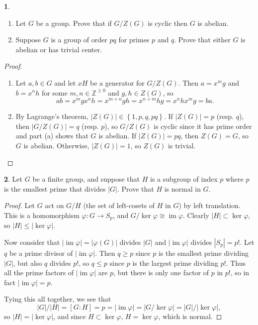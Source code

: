 \documentclass[12pt]{article}
\DeclareMathOperator{\im}{im}
\theoremstyle{definition}
\newtheorem{ex}{}
\begin{document}
\begin{ex}\
	\begin{enumerate}[label=(\alph*)]
		\item Let $G$ be a group.
		      Prove that if $G/Z(G)$ is cyclic then $G$ is abelian.
		\item Suppose $G$ is a group of order $pq$ for primes $p$ and $q$.
		      Prove that either $G$ is abelian or has trivial center.
	\end{enumerate}
\end{ex}
\begin{proof}\
	\begin{enumerate}[label=(\alph*)]
		\item Let $a, b \in G$ and let $xH$ be a generator for $G/Z(G)$.
		      Then $a = x^mg$ and $b = x^nh$ for some $m, n \in \mathbb{Z}^{\geq 0}$ and $g, h \in Z(G)$, so \begin{equation*}
			      ab = x^mgx^nh = x^{m+n}gh = x^{n+m}hg = x^nhx^mg = ba.
		      \end{equation*}
		\item By Lagrange's theorem, $|Z(G)| \in \left\lbrace 1, p, q, pq \right\rbrace$.
		      If $|Z(G)| = p$ (resp. $q$), then $|G/Z(G)| = q$ (resp. $p$), so $G/Z(G)$ is cyclic since it has prime order and part (a) shows that $G$ is abelian.
		      If $|Z(G)| = pq$, then $Z(G) = G$, so $G$ is abelian.
		      Otherwise, $|Z(G)| = 1$, so $Z(G)$ is trivial.
	\end{enumerate}
\end{proof}

\begin{ex}
	Let $G$ be a finite group, and suppose that $H$ is a subgroup of index $p$ where $p$ is the smallest prime that divides $|G|$.
	Prove that $H$ is normal in $G$.
\end{ex}
\begin{proof}
	Let $G$ act on $G/H$ (the set of left-cosets of $H$ in $G$) by left translation.
	This is a homomorphism $\varphi : G \to S_p$, and $G/\ker \varphi \cong \im \varphi$.
	Clearly $|H| \subset \ker \varphi$, so $|H| \leq |\ker \varphi|$.

	Now consider that $|\im \varphi| = |\varphi(G)|$ divides $|G|$ and $|\im\varphi|$ divides $|S_p|=p!$.
	Let $q$ be a prime divisor of $|\im\varphi|$.
	Then $q \geq p$ since $p$ is the smallest prime dividing $|G|$, but also $q$ divides $p!$, so $q \leq p$ since $p$ is the largest prime dividing $p!$.
	Thus all the prime factors of $|\im\varphi|$ are $p$, but there is only one factor of $p$ in $p!$, so in fact $|\im\varphi|=p$.

	Tying this all together, we see that \begin{equation*}
		|G|/|H| = [G : H] = p = |\im\varphi| = |G/\ker\varphi| = |G|/|\ker\varphi|,
	\end{equation*}
	so $|H| = |\ker\varphi|$, and since $H \subset \ker\varphi$, $H = \ker\varphi$, which is normal.
\end{proof}
\end{document}
